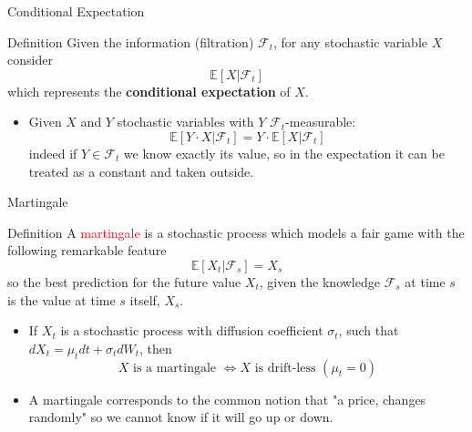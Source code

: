 \documentclass{beamer}
\begin{document}
\begin{frame}{Conditional Expectation}
	\begin{block}{Definition}
		Given the information (filtration) $\mathcal{F}_t$, for any stochastic variable $X$ consider
		\begin{equation*}
			\mathbb{E}[X|\mathcal{F}_t]
		\end{equation*}
		which represents the \textbf{conditional expectation} of $X$.
	\end{block}
	\begin{itemize}
		\item Given $X$ and $Y$ stochastic variables with $Y$ $\mathcal{F}_t$-measurable:
		\begin{equation*}
			\mathbb{E}[Y\cdot X|\mathcal{F}_t] =  Y\cdot\mathbb{E}[X|\mathcal{F}_t]
		\end{equation*}
		indeed if $Y\in\mathcal{F}_t$ we know exactly its value, so in the expectation it can be treated as a constant and taken outside.
	\end{itemize}
\end{frame}

\begin{frame}{Martingale}
	\begin{block}{Definition}
		A \textcolor{red}{martingale} is a stochastic process which models a fair game with the following remarkable feature
		\begin{equation}
			\mathbb{E}[X_t|\mathcal{F}_s] = X_s
		\end{equation}
		so the best prediction for the future value $X_t$, given the knowledge $\mathcal{F}_s$ at time $s$ is the value at time $s$ itself, $X_s$.
	\end{block}
	\begin{itemize}
	\item If $X_t$ is a stochastic process with diffusion coefficient $\sigma_t$, such that %
	$dX_t=\mu_t dt+\sigma_t dW_t$, then 
	\begin{equation*}
		X\text{ is a martingale } \iff X\text{ is drift-less } (\mu_t=0)
	\end{equation*}
	\item A martingale corresponds to the common notion that "a price, changes randomly" so we cannot know if it will go up or down.
\end{itemize}
\end{frame}
	
\end{document}
